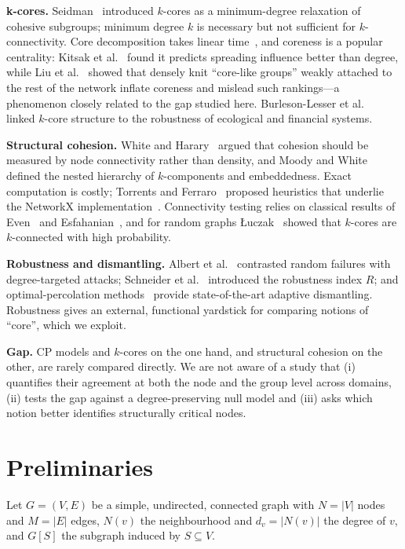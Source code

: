 \documentclass[conference]{IEEEtran}
\begin{document}
\textbf{k-cores.} Seidman~\cite{seidman1983network} introduced $k$-cores as a minimum-degree relaxation
of cohesive subgroups; minimum degree $k$ is necessary but not sufficient for $k$-connectivity. Core decomposition takes linear time~\cite{batagelj2003cores}, and coreness is
a popular centrality: Kitsak et al.~\cite{kitsak2010identification} found it predicts spreading influence
better than degree, while Liu et al.~\cite{liu2015core} showed that densely knit ``core-like groups''
weakly attached to the rest of the network inflate coreness and mislead such rankings---a phenomenon
closely related to the gap studied here. Burleson-Lesser et al.~\cite{burleson2020kcore} linked $k$-core
structure to the robustness of ecological and financial systems.

\textbf{Structural cohesion.} White and Harary~\cite{white2001cohesiveness} argued that cohesion should
be measured by node connectivity rather than density, and Moody and White~\cite{moody2003structural}
defined the nested hierarchy of $k$-components and embeddedness. Exact computation is costly; Torrents
and Ferraro~\cite{torrents2015structural} proposed heuristics that underlie the NetworkX
implementation~\cite{hagberg2008exploring}. Connectivity testing relies on classical results of
Even~\cite{even1975algorithm} and Esfahanian~\cite{esfahanian2013connectivity}, and for random graphs
{\L}uczak~\cite{luczak1991size} showed that $k$-cores are $k$-connected with high probability.

\textbf{Robustness and dismantling.} Albert et al.~\cite{albert2000error} contrasted random failures
with degree-targeted attacks; Schneider et al.~\cite{schneider2011mitigation} introduced the robustness
index $R$; and optimal-percolation methods~\cite{morone2015influence} provide state-of-the-art adaptive
dismantling. Robustness gives an external, functional yardstick for comparing notions of ``core'',
which we exploit.

\textbf{Gap.} CP models and $k$-cores on the one hand, and structural cohesion on the other, are rarely
compared directly. We are not aware of a study that (i) quantifies their agreement at both the node and
the group level across domains, (ii) tests the gap against a degree-preserving null model and (iii)
asks which notion better identifies structurally critical nodes.

\section{Preliminaries}
\label{sec:prelim}
Let $G=(V,E)$ be a simple, undirected, connected graph with $N=|V|$ nodes and $M=|E|$ edges,
$N(v)$ the neighbourhood and $d_v=|N(v)|$ the degree of $v$, and $G[S]$ the subgraph induced by $S\subseteq V$.
\end{document}
